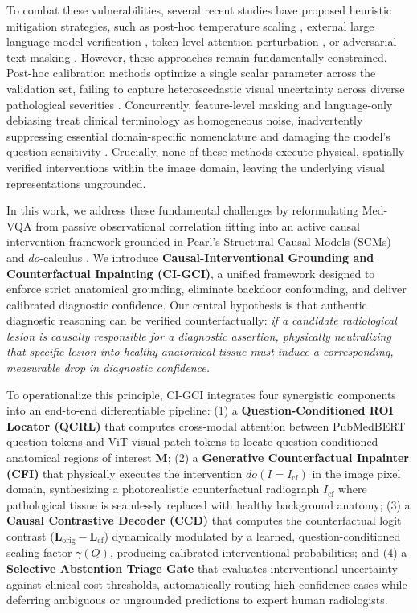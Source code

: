 \documentclass[journal,twoside,web]{ieeecolor}
\begin{document}
To combat these vulnerabilities, several recent studies have proposed heuristic mitigation strategies, such as post-hoc temperature scaling \cite{guo2017}, external large language model verification \cite{medhalltune2024}, token-level attention perturbation \cite{chen2024vihd}, or adversarial text masking \cite{wan2025decoct}. However, these approaches remain fundamentally constrained. Post-hoc calibration methods optimize a single scalar parameter across the validation set, failing to capture heteroscedastic visual uncertainty across diverse pathological severities \cite{sharifdeen2024mvcbench}. Concurrently, feature-level masking and language-only debiasing treat clinical terminology as homogeneous noise, inadvertently suppressing essential domain-specific nomenclature and damaging the model's question sensitivity \cite{wan2025decoct}. Crucially, none of these methods execute physical, spatially verified interventions within the image domain, leaving the underlying visual representations ungrounded.

In this work, we address these fundamental challenges by reformulating Med-VQA from passive observational correlation fitting into an active causal intervention framework grounded in Pearl's Structural Causal Models (SCMs) and $do$-calculus \cite{pearl2009}. We introduce \textbf{Causal-Interventional Grounding and Counterfactual Inpainting (CI-GCI)}, a unified framework designed to enforce strict anatomical grounding, eliminate backdoor confounding, and deliver calibrated diagnostic confidence. Our central hypothesis is that authentic diagnostic reasoning can be verified counterfactually: \emph{if a candidate radiological lesion is causally responsible for a diagnostic assertion, physically neutralizing that specific lesion into healthy anatomical tissue must induce a corresponding, measurable drop in diagnostic confidence.}

To operationalize this principle, CI-GCI integrates four synergistic components into an end-to-end differentiable pipeline: (1) a \textbf{Question-Conditioned ROI Locator (QCRL)} that computes cross-modal attention between PubMedBERT question tokens and ViT visual patch tokens to locate question-conditioned anatomical regions of interest $\mathbf{M}$; (2) a \textbf{Generative Counterfactual Inpainter (CFI)} that physically executes the intervention $do(I = I_{\text{cf}})$ in the image pixel domain, synthesizing a photorealistic counterfactual radiograph $I_{\text{cf}}$ where pathological tissue is seamlessly replaced with healthy background anatomy; (3) a \textbf{Causal Contrastive Decoder (CCD)} that computes the counterfactual logit contrast ($\mathbf{L}_{\text{orig}} - \mathbf{L}_{\text{cf}}$) dynamically modulated by a learned, question-conditioned scaling factor $\gamma(Q)$, producing calibrated interventional probabilities; and (4) a \textbf{Selective Abstention Triage Gate} that evaluates interventional uncertainty against clinical cost thresholds, automatically routing high-confidence cases while deferring ambiguous or ungrounded predictions to expert human radiologists.
\end{document}
